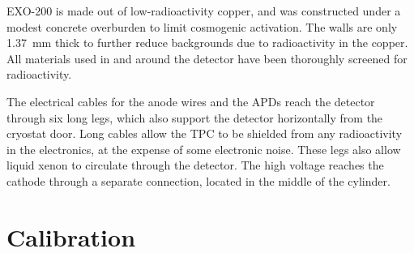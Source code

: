 \documentclass[herrin-thesis.tex]{subfiles}
\begin{document}
EXO-200 is made out of low-radioactivity copper, and was constructed under a modest concrete overburden to limit cosmogenic activation. The walls are only \SI{1.37}{\mm} thick to further reduce backgrounds due to radioactivity in the copper. All materials used in and around the detector have been thoroughly screened for radioactivity\cite{Leonard:2008uq}.

The electrical cables for the anode wires and the APDs reach the detector through six long legs, which also support the detector horizontally from the cryostat door. Long cables allow the TPC to be shielded from any radioactivity in the electronics, at the expense of some electronic noise. These legs also allow liquid xenon to circulate through the detector. The high voltage reaches the cathode through a separate connection, located in the middle of the cylinder.

\section{Calibration}
\end{document}
